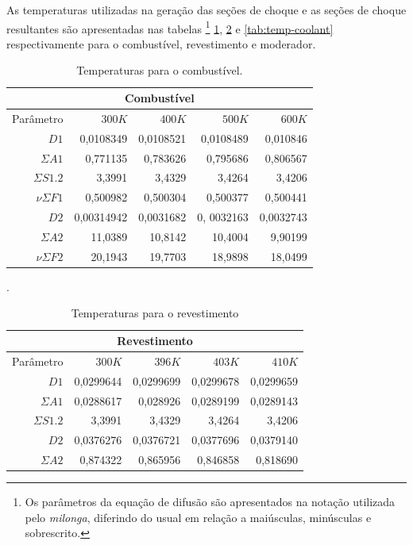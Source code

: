 As temperaturas utilizadas na geração das seções de choque
e as seções de choque resultantes são apresentadas nas tabelas
\footnote{Os parâmetros da equação de difusão são apresentados na notação utilizada
  pelo \textit{milonga}, diferindo do usual em relação a maiúsculas, minúsculas e sobrescrito.} \ref{tab:temp-fuel},
\ref{tab:temp-cladding} e \ref{tab:temp-coolant} respectivamente para o combustível, revestimento
e moderador.


\begin{table}[htb]
  \centering
  \caption[Temperaturas para combustível.]{Temperaturas para o combustível.}
  \label{tab:temp-fuel}
  \begin{tabular}{r r r r r}
  \multicolumn{5}{c}{Combustível} \\
  \hline
  Parâmetro & $300K$ & $400K$ & $500K$ & $600K$ \\
  \hline
  $D1$ & 0,0108349 & 0,0108521 & 0,0108489 & 0,010846\\
  $\Sigma A1$ & 0,771135 & 0,783626 & 0,795686 & 0,806567\\
  $\Sigma S1.2$ & 3,3991 & 3,4329 & 3,4264 & 3,4206\\
  $\nu \Sigma F1$ & 0,500982 & 0,500304 & 0,500377 & 0,500441\\
  \hline
  $D2$ & 0,00314942 & 0,0031682 & 0, 0032163 & 0,0032743 \\
  $\Sigma A2$ & 11,0389 & 10,8142 & 10,4004 & 9,90199\\
  $\nu \Sigma F2$ & 20,1943 & 19,7703 & 18,9898 & 18,0499\\
  \hline
\end{tabular}
\end{table}

\begin{table}[htb]
  \centering
  \caption[Temperaturas para o revestimento.]{Temperaturas para o revestimento}.
  \label{tab:temp-cladding}
  \begin{tabular}{r r r r r}
    \multicolumn{5}{c}{Revestimento} \\
    \hline
    Parâmetro & $300K$ & $396K$ & $403K$ & $410K$ \\
    \hline
    $D1$ & 0,0299644 & 0,0299699 & 0,0299678 & 0,0299659 \\
    $\Sigma A1$ & 0,0288617 & 0,028926 & 0,0289199 & 0,0289143 \\
    $\Sigma S1.2$ & 3,3991 & 3,4329 & 3,4264 & 3,4206\\
    \hline
    $D2$ & 0,0376276 & 0,0376721 & 0,0377696 & 0,0379140\\
    $\Sigma A2$ & 0,874322 & 0,865956 & 0,846858 & 0,818690\\
    \hline
  \end{tabular}
\end{table}

